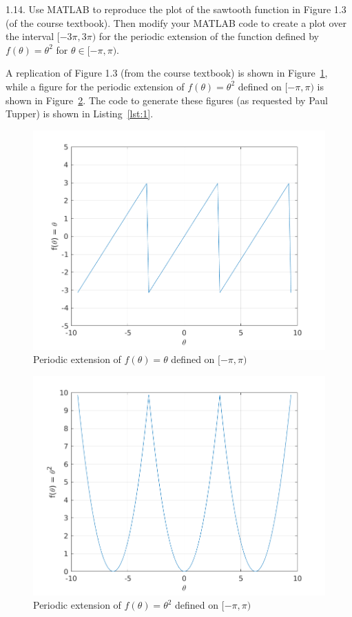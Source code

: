 \documentclass{article}
\begin{document}
\newpage

1.14. Use MATLAB to reproduce the plot of the sawtooth function in
  Figure 1.3 (of the course textbook). Then modify your MATLAB code to
  create a plot over the interval $[-3 \pi, 3 \pi)$ for the periodic
  extension of the function defined by $f(\theta) = \theta^2$ for
  $\theta \in [-\pi, \pi)$.

A replication of Figure 1.3 (from the course textbook) is shown in
Figure~\ref{fig:1-14-a}, while a figure for the periodic extension of
$f(\theta) = \theta^2$ defined on $[-\pi, \pi)$ is shown in
Figure~\ref{fig:1-14-b}. The code to generate these figures
(as requested by Paul Tupper) is shown in Listing~\ref{lst:1}.
%
\begin{figure}[ht]
    \includegraphics[width=35em]{q114a}
    \centering
    \caption{Periodic extension of $f(\theta) = \theta$ defined on $[-\pi, \pi)$}
    \label{fig:1-14-a}
\end{figure}

\begin{figure}
    \includegraphics[width=35em]{q114b}
    \centering
    \caption{Periodic extension of $f(\theta) = \theta^2$ defined on $[-\pi, \pi)$}
    \label{fig:1-14-b}
\end{figure}
\end{document}
